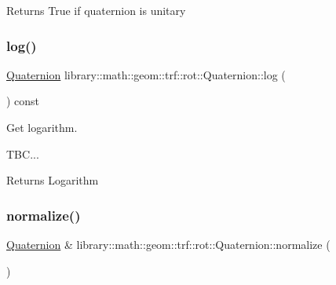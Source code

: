 \begin{DoxyReturn}{Returns}
True if quaternion is unitary 
\end{DoxyReturn}
\mbox{\label{classlibrary_1_1math_1_1geom_1_1trf_1_1rot_1_1_quaternion_a9bcc04be5d0b9128860c9e494abbf5ee}} 
\subsubsection{\texorpdfstring{log()}{log()}}
{\footnotesize\ttfamily \hyperlink{classlibrary_1_1math_1_1geom_1_1trf_1_1rot_1_1_quaternion}{Quaternion} library\+::math\+::geom\+::trf\+::rot\+::\+Quaternion\+::log (\begin{DoxyParamCaption}{ }\end{DoxyParamCaption}) const}



Get logarithm. 


\begin{DoxyCode}
TBC...
\end{DoxyCode}


\begin{DoxyReturn}{Returns}
Logarithm 
\end{DoxyReturn}
\mbox{\label{classlibrary_1_1math_1_1geom_1_1trf_1_1rot_1_1_quaternion_a54cc89da4b3f36d7037b940c141e07ce}} 
\subsubsection{\texorpdfstring{normalize()}{normalize()}}
{\footnotesize\ttfamily \hyperlink{classlibrary_1_1math_1_1geom_1_1trf_1_1rot_1_1_quaternion}{Quaternion} \& library\+::math\+::geom\+::trf\+::rot\+::\+Quaternion\+::normalize (\begin{DoxyParamCaption}{ }\end{DoxyParamCaption})}




